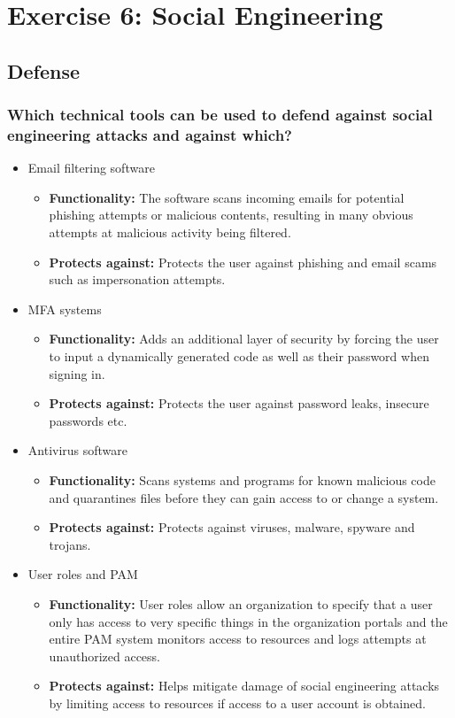 \section{Exercise 6: Social Engineering}

\subsection{Defense}
\subsubsection{Which technical tools can be used to defend against social engineering attacks and against which?}
\begin{itemize}
    \item Email filtering software
          \begin{itemize}
              \item \textbf{Functionality: } The software scans incoming emails for potential phishing attempts or malicious contents, resulting in many obvious attempts at malicious activity being filtered.
              \item \textbf{Protects against: } Protects the user against phishing and email scams such as impersonation attempts.
          \end{itemize}
    \item MFA systems
          \begin{itemize}
              \item \textbf{Functionality: } Adds an additional layer of security by forcing the user to input a dynamically generated code as well as their password when signing in.
              \item \textbf{Protects against: } Protects the user against password leaks, insecure passwords etc.
          \end{itemize}
    \item Antivirus software
          \begin{itemize}
              \item \textbf{Functionality: } Scans systems and programs for known malicious code and quarantines files before they can gain access to or change a system.
              \item \textbf{Protects against: } Protects against viruses, malware, spyware and trojans.
          \end{itemize}
    \item User roles and PAM
          \begin{itemize}
              \item \textbf{Functionality: } User roles allow an organization to specify that a user only has access to very specific things in the organization portals and the entire PAM system monitors access to resources and logs attempts at unauthorized access.
              \item \textbf{Protects against: } Helps mitigate damage of social engineering attacks by limiting access to resources if access to a user account is obtained.
          \end{itemize}
\end{itemize}
